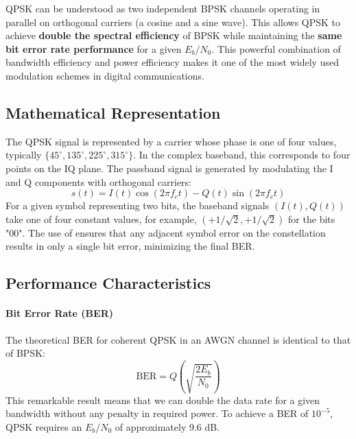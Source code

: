 \begin{keyconcept}
    QPSK can be understood as two independent BPSK channels operating in parallel on orthogonal carriers (a cosine and a sine wave). This allows QPSK to achieve \textbf{double the spectral efficiency} of BPSK while maintaining the \textbf{same bit error rate performance} for a given $E_b/N_0$. This powerful combination of bandwidth efficiency and power efficiency makes it one of the most widely used modulation schemes in digital communications.
\end{keyconcept}


\subsection{Mathematical Representation}

The QPSK signal is represented by a carrier whose phase is one of four values, typically $\{45^\circ, 135^\circ, 225^\circ, 315^\circ\}$. In the complex baseband, this corresponds to four points on the IQ plane. The passband signal is generated by modulating the I and Q components with orthogonal carriers:
\begin{equation}
    s(t) = I(t) \cos(2\pi f_c t) - Q(t) \sin(2\pi f_c t)
\end{equation}
For a given symbol representing two bits, the baseband signals $(I(t), Q(t))$ take one of four constant values, for example, $(+1/\sqrt{2}, +1/\sqrt{2})$ for the bits "00". The use of  ensures that any adjacent symbol error on the constellation results in only a single bit error, minimizing the final BER.


\subsection{Performance Characteristics}

\paragraph{Bit Error Rate (BER)}
The theoretical BER for coherent QPSK in an AWGN channel is identical to that of BPSK:
\begin{equation}
    \text{BER} = Q\left(\sqrt{\frac{2E_b}{N_0}}\right)
\end{equation}
This remarkable result means that we can double the data rate for a given bandwidth without any penalty in required power. To achieve a BER of $10^{-5}$, QPSK requires an $E_b/N_0$ of approximately 9.6 dB.

